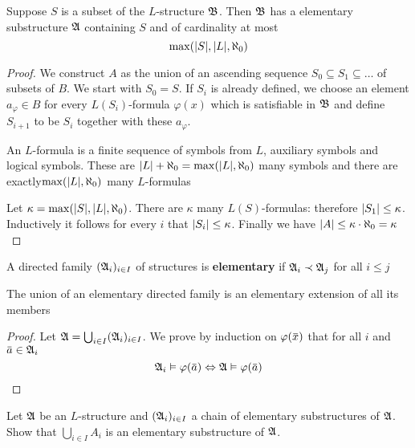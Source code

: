\documentclass[11pt]{article}
\begin{document}
\begin{corollary}[]
\label{cor2.1.3}
Suppose \(S\) is a subset of the \(L\)-structure \(\mathfrak{B}\). Then \(\mathfrak{B}\) has a
elementary substructure \(\mathfrak{A}\) containing \(S\) and of cardinality at most
\begin{equation*}
\max(\abs{S},\abs{L},\aleph_0)
\end{equation*}
\end{corollary}

\begin{proof}
We construct \(A\) as the union of an ascending sequence \(S_0\subseteq S_1\subseteq\dots\) of subsets of \(B\). We
start with \(S_0=S\). If \(S_i\) is already defined, we choose an element \(a_\varphi\in B\) for
every \(L(S_i)\)-formula \(\varphi(x)\) which is satisfiable in \(\mathfrak{B}\) and define \(S_{i+1}\) to
be \(S_i\) together with these \(a_{\varphi}\).

An \(L\)-formula is a finite sequence of symbols from \(L\), auxiliary symbols and logical
symbols. These are \(\abs{L}+\aleph_0=\max(\abs{L},\aleph_0)\) many symbols and there are
exactly\(\max(\abs{L},\aleph_0)\) many \(L\)-formulas

Let \(\kappa=\max(\abs{S},\abs{L},\aleph_0)\). There are \(\kappa\) many
\(L(S)\)-formulas: therefore \(\abs{S_1}\le\kappa\). Inductively it follows
for every \(i\) that \(\abs{S_i}\le\kappa\). Finally we have \(\abs{A}\le\kappa\cdot\aleph_0=\kappa\)
\end{proof}

A directed family \((\mathfrak{A}_i)_{i\in I}\) of structures is \textbf{elementary} if
\(\mathfrak{A}_i\prec\mathfrak{A}_j\) for all \(i\le j\)

\begin{theorem}
\label{thm2.1.4}
The union of an elementary directed family is an elementary extension of all
its members
\end{theorem}

\begin{proof}
Let \(\mathfrak{A}=\bigcup_{i\in I}(\mathfrak{A}_i)_{i\in I}\). We prove by induction on
\(\varphi(\bbar{x})\) that for all \(i\) and \(\bbar{a}\in\fA_i\)
\begin{equation*}
\fA_i\vDash\varphi(\bbar{a})\Leftrightarrow\fA\vDash\varphi(\bbar{a})
\end{equation*}
\end{proof}

\begin{exercise}
\label{ex2.1.1}
Let \(\mathfrak{A}\) be an \(L\)-structure and \((\mathfrak{A}_i)_{i\in I}\) a chain of elementary substructures of \(\mathfrak{A}\).
Show that \(\bigcup_{i\in I}A_i\) is an elementary substructure of \(\mathfrak{A}\).
\end{exercise}
\end{document}
